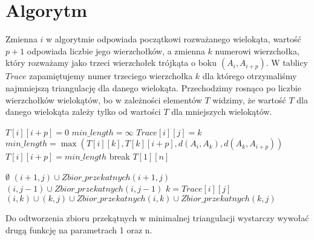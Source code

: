 \documentclass{article}
\begin{document}
\section{Algorytm}
Zmienna $i$ w algorytmie odpowiada początkowi rozważanego wielokąta, wartość $p+1$ odpowiada liczbie jego wierzchołków, a zmienna $k$ numerowi wierzchołka, który rozważamy jako trzeci wierzchołek trójkąta o boku $(A_i, A_{i+p})$. W tablicy $Trace$ zapamiętujemy numer trzeciego wierzchołka $k$ dla którego otrzymaliśmy najmniejszą triangulację dla danego wielokąta. Przechodzimy rosnąco po liczbie wierzchołków wielokątów, bo w zależności elementów $T$ widzimy, że wartość $T$ dla danego wielokąta zależy tylko od wartości $T$ dla mniejszych wielokątów. \pagebreak
\begin{algorithm}
\caption{$Minimalna\_triangulacja$}
\begin{algorithmic}[1]
            \State $T[i][i+p] = 0$
        \EndIf 
    \EndFor
\EndFor
{}
            \State $min\_length = \infty$
                    \State $Trace[i][j] = k$
                    \State $min\_length = \max(T[i][k], T[k][i+p], d(A_i, A_k), d(A_k, A_{i+p}))$
                \EndIf
            \EndFor
            \State $T[i][i+p] = min\_length$
        \Else
            \State break
        \EndIf
    \EndFor
\EndFor
\State \Return $T[1][n]$
\end{algorithmic}
\end{algorithm}

\begin{algorithm}
\caption{$Zbior\_przekatnych(i, j)$}
\begin{algorithmic}[1]
        \State \Return $\emptyset$
    \EndIf
        \State  \Return $(i+1, j) \cup Zbior\_przekatnych(i+1, j)$
    \EndIf
        \State  \Return $(i, j-1) \cup Zbior\_przekatnych(i, j-1)$
    \EndIf
    \State $k = Trace[i][j]$
    \State \Return $(i, k) \cup (k, j) \cup Zbior\_przekatnych(i, k) \cup Zbior\_przekatnych(k, j)$
\end{algorithmic}
\end{algorithm}

Do odtworzenia zbioru przekątnych w minimalnej triangulacji wystarczy wywołać drugą funkcję na parametrach 1 oraz n. 
\end{document}
